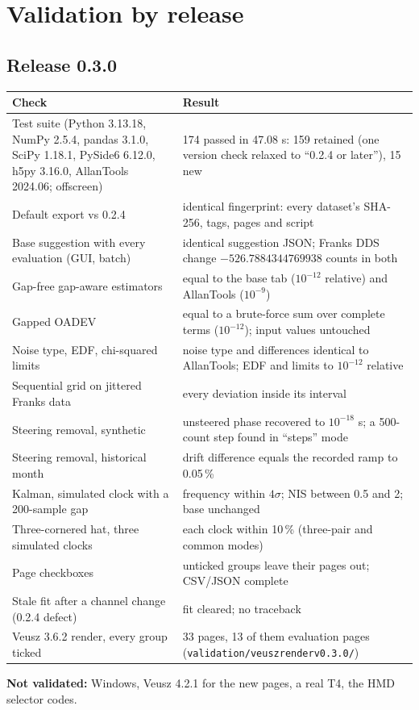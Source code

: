 \documentclass[11pt,a4paper]{article}
\renewcommand{\_}{\usscore\allowbreak}
\newenvironment{ctable}[1]{\par\begin{center}\begin{minipage}{\linewidth}\centering\small\captionof{table}{#1}}
 {\end{minipage}\end{center}}
\begin{document}
\section{Validation by release}
\subsection{Release 0.3.0}
\begin{ctable}{Validation of release 0.3.0\label{tab:val030}}
\begin{tabular}{@{}P{.42\linewidth}P{.5\linewidth}@{}}
\toprule
Check & Result\\
\midrule
Test suite (Python 3.13.18, NumPy 2.5.4, pandas 3.1.0, SciPy 1.18.1, PySide6 6.12.0, h5py 3.16.0, AllanTools 2024.06; offscreen) & 174 passed in 47.08 s: 159 retained (one version check relaxed to ``0.2.4 or later''), 15 new\\
Default export vs 0.2.4 & identical fingerprint: every dataset's SHA-256, tags, pages and script\\
Base suggestion with every evaluation (GUI, batch) & identical suggestion JSON; Franks DDS change \(-526.7884344769938\) counts in both\\
Gap-free gap-aware estimators & equal to the base tab (\(10^{-12}\) relative) and AllanTools (\(10^{-9}\))\\
Gapped OADEV & equal to a brute-force sum over complete terms (\(10^{-12}\)); input values untouched\\
Noise type, EDF, chi-squared limits & noise type and differences identical to AllanTools; EDF and limits to \(10^{-12}\) relative\\
Sequential grid on jittered Franks data & every deviation inside its interval\\
Steering removal, synthetic & unsteered phase recovered to \(10^{-18}\) s; a 500-count step found in ``steps'' mode\\
Steering removal, historical month & drift difference equals the recorded ramp to 0.05\,\%\\
Kalman, simulated clock with a 200-sample gap & frequency within \(4\sigma\); NIS between 0.5 and 2; base unchanged\\
Three-cornered hat, three simulated clocks & each clock within 10\,\% (three-pair and common modes)\\
Page checkboxes & unticked groups leave their pages out; CSV/JSON complete\\
Stale fit after a channel change (0.2.4 defect) & fit cleared; no traceback\\
Veusz 3.6.2 render, every group ticked & 33 pages, 13 of them evaluation pages (\texttt{validation/veusz\_render\_v0.3.0/})\\
\bottomrule
\end{tabular}
\end{ctable}
\textbf{Not validated:} Windows, Veusz 4.2.1 for the new pages, a real T4, the HMD selector codes.
\end{document}

